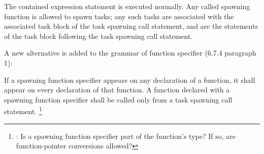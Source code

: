
\pnum
The contained expression statement is executed normally.
Any called spawning function is allowed to spawn tasks;
any such tasks are associated with the associated task block
of the task spawning call statement,
and are
the statements of the task block
following the task spawning call statement.

\begin{note}
\end{note}

\pnum
A new alternative is added to the grammar of function specifier
(6.7.4 paragraph 1):

\begin{bnf}
\br
{} 
\end{bnf}

\pnum
If a spawning function specifier appears
on any declaration of a function,
it shall appear on every declaration of that function.
A function declared with a spawning function specifier
shall be called only from a task spawning call statement.
\footnote{:
Is a spawning function specifier part of the function's type?
If so, are function-pointer conversions allowed?
}